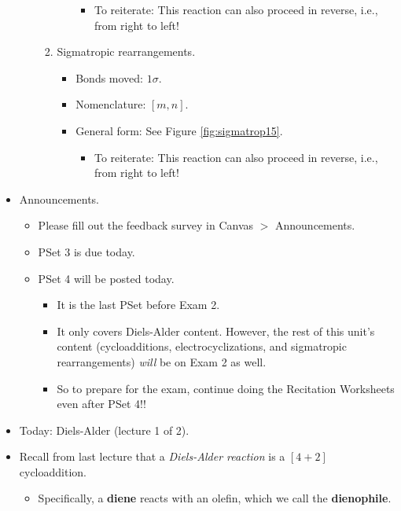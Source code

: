 \documentclass[../notes.tex]{subfiles}
\begin{document}
\begin{itemize}
\begin{itemize}
\begin{enumerate}
\begin{itemize}
\begin{itemize}
                    \item To reiterate: This reaction can also proceed in reverse, i.e., from right to left!
                \end{itemize}
            \end{itemize}
            \item Sigmatropic rearrangements.
            \begin{itemize}
                \item Bonds moved: $1\sigma$.
                \item Nomenclature: $[m,n]$.
                \item General form: See Figure \ref{fig:sigmatrop15}.
                \begin{itemize}
                    \item To reiterate: This reaction can also proceed in reverse, i.e., from right to left!
                \end{itemize}
            \end{itemize}
        \end{enumerate}
    \end{itemize}
    \item Announcements.
    \begin{itemize}
        \item Please fill out the feedback survey in Canvas $>$ Announcements.
        \item PSet 3 is due today.
        \item PSet 4 will be posted today.
        \begin{itemize}
            \item It is the last PSet before Exam 2.
            \item It only covers Diels-Alder content. However, the rest of this unit's content (cycloadditions, electrocyclizations, and sigmatropic rearrangements) \emph{will} be on Exam 2 as well.
            \item So to prepare for the exam, continue doing the Recitation Worksheets even after PSet 4!!
        \end{itemize}
    \end{itemize}
    \item Today: Diels-Alder (lecture 1 of 2).
    \item Recall from last lecture that a \emph{Diels-Alder reaction} is a $[4+2]$ cycloaddition.
    \begin{itemize}
        \item Specifically, a \textbf{diene} reacts with an olefin, which we call the \textbf{dienophile}.

\end{itemize}
\end{itemize}
\end{document}
